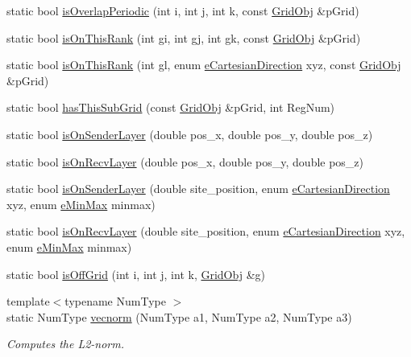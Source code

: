 \begin{DoxyCompactItemize}
static bool \hyperlink{class_grid_utils_a7c13884020ab181ee8cb6dd2ea7e4fd7}{is\+Overlap\+Periodic} (int i, int j, int k, const \hyperlink{class_grid_obj}{Grid\+Obj} \&p\+Grid)
\item 
static bool \hyperlink{class_grid_utils_ac1c2d23d0cdd548368aaaffb4f22502d}{is\+On\+This\+Rank} (int gi, int gj, int gk, const \hyperlink{class_grid_obj}{Grid\+Obj} \&p\+Grid)
\item 
static bool \hyperlink{class_grid_utils_a1d9558846f757c6f60fa61f104b63071}{is\+On\+This\+Rank} (int gl, enum \hyperlink{_grid_utils_8h_afbad8e4a2f1e9903755b1bd2fe8273cf}{e\+Cartesian\+Direction} xyz, const \hyperlink{class_grid_obj}{Grid\+Obj} \&p\+Grid)
\item 
static bool \hyperlink{class_grid_utils_a0863e64842ddc907d0a2ab22b9624e07}{has\+This\+Sub\+Grid} (const \hyperlink{class_grid_obj}{Grid\+Obj} \&p\+Grid, int Reg\+Num)
\item 
static bool \hyperlink{class_grid_utils_af0692236725709af2d98872805fc84ae}{is\+On\+Sender\+Layer} (double pos\+\_\+x, double pos\+\_\+y, double pos\+\_\+z)
\item 
static bool \hyperlink{class_grid_utils_abfec29d90b6942de2f3c52c225a4d888}{is\+On\+Recv\+Layer} (double pos\+\_\+x, double pos\+\_\+y, double pos\+\_\+z)
\item 
static bool \hyperlink{class_grid_utils_a70a234125350fca607d3943e0f1edd7c}{is\+On\+Sender\+Layer} (double site\+\_\+position, enum \hyperlink{_grid_utils_8h_afbad8e4a2f1e9903755b1bd2fe8273cf}{e\+Cartesian\+Direction} xyz, enum \hyperlink{_grid_utils_8h_a8e005b039da2246588381c4feeeac43f}{e\+Min\+Max} minmax)
\item 
static bool \hyperlink{class_grid_utils_af2b6e1225cab2a840110e2a70f6bd23c}{is\+On\+Recv\+Layer} (double site\+\_\+position, enum \hyperlink{_grid_utils_8h_afbad8e4a2f1e9903755b1bd2fe8273cf}{e\+Cartesian\+Direction} xyz, enum \hyperlink{_grid_utils_8h_a8e005b039da2246588381c4feeeac43f}{e\+Min\+Max} minmax)
\item 
static bool \hyperlink{class_grid_utils_a48709fd0b88db1e79bbc3a12026fe33a}{is\+Off\+Grid} (int i, int j, int k, \hyperlink{class_grid_obj}{Grid\+Obj} \&g)
\item 
{\footnotesize template$<$typename Num\+Type $>$ }\\static Num\+Type \hyperlink{class_grid_utils_a78aa4876d7066bce253c52457e7b901d}{vecnorm} (Num\+Type a1, Num\+Type a2, Num\+Type a3)
\begin{DoxyCompactList}\small\item\em Computes the L2-\/norm. \end{DoxyCompactList}\item 

\end{DoxyCompactItemize}
